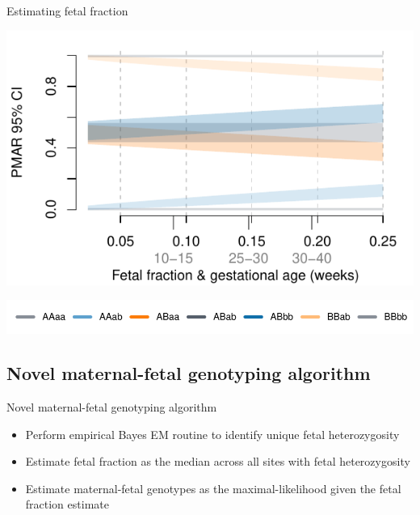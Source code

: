 \documentclass[
  10pt,
  ignorenonframetext,
  m]{beamer}
\begin{document}
\begin{frame}{Estimating fetal fraction}
\protect\hypertarget{estimating-fetal-fraction-1}{}

\begin{center}\includegraphics{defense_files/figure-beamer/expMaf250-1} \end{center}

\centering \includegraphics{defense_files/figure-beamer/genoLgnd-1.pdf}

\end{frame}

\hypertarget{novel-maternal-fetal-genotyping-algorithm}{%
\subsection{Novel maternal-fetal genotyping
algorithm}\label{novel-maternal-fetal-genotyping-algorithm}}

\begin{frame}{Novel maternal-fetal genotyping algorithm}
\protect\hypertarget{novel-maternal-fetal-genotyping-algorithm-1}{}

\begin{itemize}
\item
  Perform empirical Bayes EM routine to identify unique fetal
  heterozygosity
\item
  Estimate fetal fraction as the median across all sites with fetal
  heterozygosity
\item
  Estimate maternal-fetal genotypes as the maximal-likelihood given the
  fetal fraction estimate
\end{itemize}

\end{frame}
\end{document}
